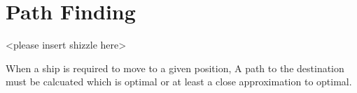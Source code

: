\section{Path Finding}
<please insert shizzle here>

\begin{comment}

what pathfinding is
what it's used by (ships)
how navigation works on a map with planets and space lanes.

optimal path:
- A*
making the ship follow path more naturally:
- bezier
- fluid flow
\end{comment}


When a ship is required to move to a given position, A path to the destination must be calcuated which is optimal or at least a close approximation to optimal. 
